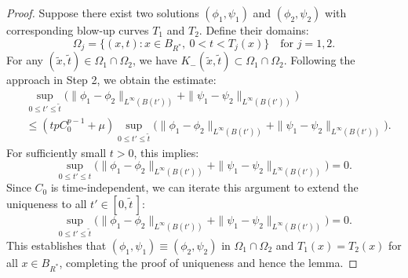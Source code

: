 \documentclass[10pt,a4paper]{amsart}
\begin{document}
\begin{proof}
Suppose there exist two solutions $(\phi_1, \psi_1)$ and $(\phi_2, \psi_2)$ with corresponding blow-up curves $T_1$ and $T_2$. Define their domains:
$$
\Omega_j = \{(x, t) : x \in B_{R^*}, \ 0 < t < T_j(x)\} \quad \text{for } j = 1,2.
$$
For any $(\tilde{x}, \tilde{t}) \in \Omega_1 \cap \Omega_2$, we have $K_-(\tilde{x}, \tilde{t}) \subset \Omega_1 \cap \Omega_2$. Following the approach in Step 2, we obtain the estimate:
$$\begin{aligned}
&\sup_{0 \leq t' \leq \tilde{t}} \Big( \|\phi_1 - \phi_2\|_{L^\infty(B(t'))} + \|\psi_1 - \psi_2\|_{L^\infty(B(t'))} \Big)\\
&\leq (t p C_0^{p-1} + \mu) \sup_{0 \leq t' \leq \tilde{t}} \Big( \|\phi_1 - \phi_2\|_{L^\infty(B(t'))} + \|\psi_1 - \psi_2\|_{L^\infty(B(t'))} \Big).
\end{aligned}
$$
For sufficiently small $t > 0$, this implies:
$$
\sup_{0 \leq t' \leq t} \Big( \|\phi_1 - \phi_2\|_{L^\infty(B(t'))} + \|\psi_1 - \psi_2\|_{L^\infty(B(t'))} \Big) = 0.
$$
Since $C_0$ is time-independent, we can iterate this argument to extend the uniqueness to all $t' \in [0, \tilde{t}\,]$:
$$
\sup_{0 \leq t' \leq \tilde{t}} \Big( \|\phi_1 - \phi_2\|_{L^\infty(B(t'))} + \|\psi_1 - \psi_2\|_{L^\infty(B(t'))} \Big) = 0.
$$
This establishes that
 $(\phi_1, \psi_1) \equiv (\phi_2, \psi_2)$ in $\Omega_1 \cap \Omega_2$ and
 $T_1(x) = T_2(x)$ for all $x \in B_{R^*}$,
completing the proof of uniqueness and hence the lemma.
\end{proof}
\end{document}
